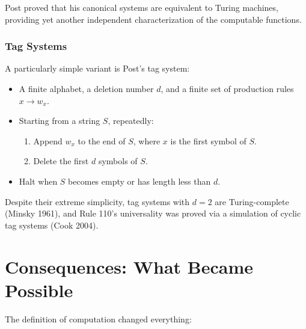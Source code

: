 Post proved that his canonical systems are equivalent to Turing machines, providing yet another independent characterization of the computable functions.

\subsubsection*{Tag Systems}

A particularly simple variant is Post's tag system:
\begin{itemize}
\item A finite alphabet, a deletion number $d$, and a finite set of production rules $x \to w_x$.
\item Starting from a string $S$, repeatedly:
\begin{enumerate}
\item Append $w_x$ to the end of $S$, where $x$ is the first symbol of $S$.
\item Delete the first $d$ symbols of $S$.
\end{enumerate}
\item Halt when $S$ becomes empty or has length less than $d$.
\end{itemize}

Despite their extreme simplicity, tag systems with $d=2$ are Turing-complete (Minsky 1961), and Rule 110's universality was proved via a simulation of cyclic tag systems (Cook 2004).

\section{Consequences: What Became Possible}
\label{sec:computation:consequences}

The definition of computation changed everything:

